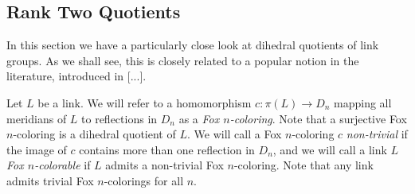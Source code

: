 \documentclass{article}
\theoremstyle{definition}
\begin{document}
\subsection{Rank Two Quotients}\label{subsec:rank-two}
In this section we have a particularly close look at dihedral quotients of link groups. As we shall see, this is closely related to a popular notion in the literature, introduced in [...]. %

Let $L$ be a link. We will refer to a homomorphism $c: \pi(L) \rightarrow D_n$ mapping all meridians of $L$ to reflections in $D_n$ as a \textit{Fox $n$-coloring}. Note that a surjective Fox $n$-coloring is a dihedral quotient of $L$. We will call a Fox $n$-coloring $c$ \textit{non-trivial} if the image of $c$ contains more than one reflection in $D_n$, and we will call a link $L$ \textit{Fox $n$-colorable} if $L$ admits a non-trivial Fox $n$-coloring. Note that any link admits trivial Fox $n$-colorings for all $n$.
\end{document}
